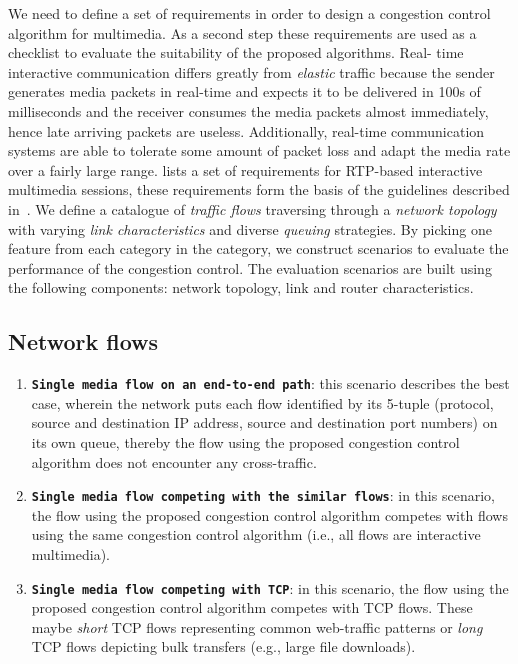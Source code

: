 We need to define a set of requirements in order to design a congestion
control algorithm for multimedia. As a second step these requirements are used
as a checklist to evaluate the suitability of the proposed algorithms. Real-
time interactive communication differs greatly from \emph{elastic} traffic
because the sender generates media packets in real-time and expects it to be
delivered in 100s of milliseconds and the receiver consumes the media packets
almost immediately, hence late arriving packets are useless. Additionally,
real-time communication systems are able to tolerate some amount of packet
loss and adapt the media rate over a fairly large range.
\cite{draft.rmcat.req} lists a set of requirements for RTP-based interactive
multimedia sessions, these requirements form the basis of the guidelines
described in~\cite{draft.rmcat.evaluate}.  We define a catalogue of
\emph{traffic flows} traversing through a \emph{network topology} with varying
\emph{link characteristics} and diverse \emph{queuing} strategies. By picking
one feature from each category in the category, we construct scenarios to
evaluate the performance of the congestion control. The evaluation scenarios
are built using the following components: network topology, link and router
characteristics.

\subsection{Network flows}

\begin{enumerate}
\setlength{\itemsep}{5pt}

\item \textbf{\texttt{Single media flow on an end-to-end path}}: this scenario
describes the best case, wherein the network puts each flow identified by its
5-tuple (protocol, source and destination IP address, source and destination
port numbers) on its own queue, thereby the flow using the proposed congestion
control algorithm does not encounter any cross-traffic.

\item \textbf{\texttt{Single media flow competing with the similar flows}}: in
this scenario, the flow using the proposed congestion control algorithm
competes with flows using the same congestion control algorithm (i.e., all
flows are interactive multimedia).


\item \textbf{\texttt{Single media flow competing with TCP}}: in this
scenario, the flow using the proposed congestion control algorithm competes
with TCP flows. These maybe \emph{short} TCP flows representing common
web-traffic patterns or \emph{long} TCP flows depicting bulk transfers (e.g.,
large file downloads).

\end{enumerate}

